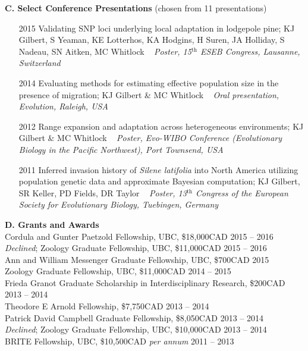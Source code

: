 \vspace{6pt}	
%
%
\noindent \textbf{C.  Select Conference Presentations} (chosen from 11 presentations)
\begin{enumerate}[nolistsep]

\item[2015] Validating SNP loci underlying local adaptation in lodgepole pine; KJ Gilbert, S Yeaman, KE Lotterhos, KA Hodgins, H Suren, JA Holliday, S Nadeau, SN Aitken, MC Whitlock ~ \emph{Poster, 15$^{\textrm{th}}$ ESEB Congress, Lausanne, Switzerland}
	
\item[2014] Evaluating methods for estimating effective population size in the presence of migration; KJ Gilbert \& MC Whitlock ~ \emph{Oral presentation, Evolution, Raleigh, USA}

\item[2012] Range expansion and adaptation across heterogeneous environments; KJ Gilbert \& MC Whitlock ~ \emph{Poster, Evo-WIBO Conference (Evolutionary Biology in the Pacific Northwest), Port Townsend, USA}

\item[2011] Inferred invasion history of \emph{Silene latifolia} into North America utilizing population genetic data and approximate Bayesian computation; KJ Gilbert, SR Keller, PD Fields, DR Taylor ~ \emph{Poster, 13$^{\textrm{th}}$ Congress of the European Society for Evolutionary Biology, Tuebingen, Germany}

\end{enumerate}	
	
\vspace{6pt}	

\noindent
\textbf{D.  Grants and Awards}\\
\textmd{Cordula and Gunter Paetzold Fellowship, UBC, \$18,000CAD} \hfill {2015 -- 2016}\\
\textmd{\emph{Declined}; Zoology Graduate Fellowship, UBC, \$11,000CAD} \hfill {2015 -- 2016}\\
\textmd{Ann and William Messenger Graduate Fellowship, UBC, \$700CAD} \hfill {2015}\\
\textmd{Zoology Graduate Fellowship, UBC, \$11,000CAD} \hfill {2014 -- 2015}\\
\textmd{Frieda Granot Graduate Scholarship in Interdisciplinary Research, \$200CAD} \hfill {2013 -- 2014}\\
\textmd{Theodore E Arnold Fellowship, \$7,750CAD} \hfill {2013 -- 2014}\\
\textmd{Patrick David Campbell Graduate Fellowship, \$8,050CAD} \hfill {2013 -- 2014}\\
\textmd{\emph{Declined}; Zoology Graduate Fellowship, UBC, \$10,000CAD} \hfill {2013 -- 2014}\\
\textmd{BRITE Fellowship, UBC, \$10,500CAD \emph{per annum}} \hfill {2011 -- 2013}\\

